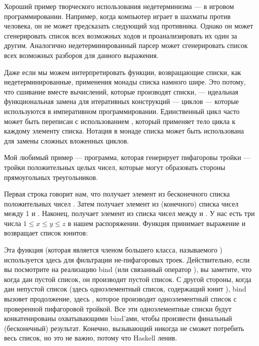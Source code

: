 Хороший пример творческого использования недетерминизма --- в игровом
программировании. Например, когда компьютер играет в шахматы против человека,
он не может предсказать следующий ход противника. Однако он может сгенерировать
список всех возможных ходов и проанализировать их один за другим. Аналогично
недетерминированный парсер может сгенерировать список всех возможных разборов для
данного выражения.

Даже если мы можем интерпретировать функции, возвращающие списки, как
недетерминированные, применения монады списка намного шире.
Это потому, что сшивание вместе вычислений, которые производят списки, ---
идеальная функциональная замена для итеративных конструкций --- циклов ---
которые используются в императивном программировании. Единственный цикл часто может быть
переписан с использованием , который применяет тело цикла к каждому
элементу списка. Нотация  в монаде списка может быть
использована для замены сложных вложенных циклов.

Мой любимый пример --- программа, которая генерирует пифагоровы тройки
--- тройки положительных целых чисел, которые могут образовать стороны прямоугольных треугольников.

Первая строка говорит нам, что  получает элемент из бесконечного
списка положительных чисел \code{{[}1..{]}}. Затем  получает
элемент из (конечного) списка \code{{[}1..z{]}} чисел между 1
и . Наконец,  получает элемент из списка
чисел между  и . У нас есть три числа
$1 \leqslant x \leqslant y \leqslant z$ в нашем
распоряжении. Функция  принимает выражение 
и возвращает список юнитов:

Эта функция (которая является членом большего класса, называемого
) используется здесь для фильтрации не-пифагоровых троек.
Действительно, если вы посмотрите на реализацию bind (или связанный
оператор \code{>>}), вы заметите, что
когда дан пустой список, он производит пустой список. С другой стороны,
когда дан непустой список (здесь одноэлементный список, содержащий юнит
\code{{[}(){]}}), bind вызовет продолжение, здесь
, которое производит одноэлементный список с
проверенной пифагоровой тройкой. Все эти одноэлементные списки будут
конкатенированы охватывающими bind'ами, чтобы произвести финальный (бесконечный)
результат. Конечно, вызывающий  никогда не сможет
потребить весь список, но это не важно, потому что Haskell
ленив.

